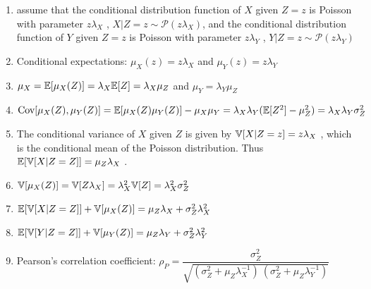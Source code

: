 \begin{enumerate}
    \item assume that the conditional distribution function of $X$ given $Z = z$ is Poisson with parameter $z\lambda_X$ , $X|Z = z \sim \mathcal{P}(z\lambda_X )$, and the conditional distribution function of $Y$ given $Z = z$ is Poisson with parameter $z\lambda_Y$ , $Y |Z = z \sim \mathcal{P}(z\lambda_Y )$
    \hfill \cite{statistics/book/Statistics-for-Data-Scientists/Maurits-Kaptein}

    \item Conditional expectations: $\mu_X (z) = z\lambda_X$ and $\mu_Y (z) = z\lambda_Y$
    \hfill \cite{statistics/book/Statistics-for-Data-Scientists/Maurits-Kaptein}

    \item $\mu_X = \mathbb{E}[\mu_X (Z )] = \lambda_X \mathbb{E}[Z] = \lambda_X \mu_Z$ and $\mu_Y = \lambda_Y \mu_Z$ 
    \hfill \cite{statistics/book/Statistics-for-Data-Scientists/Maurits-Kaptein}

    \item 
    $
        \text{Cov}[\mu_X (Z ), \mu_Y (Z )] 
        = \mathbb{E}[\mu_X (Z )\mu_Y (Z )] - \mu_X \mu_Y 
        = \lambda_X \lambda_Y ( \mathbb{E}[Z^2] - \mu^2_Z ) 
        = \lambda_X \lambda_Y \sigma^2_Z 
    $
    \hfill \cite{statistics/book/Statistics-for-Data-Scientists/Maurits-Kaptein}

    \item The conditional variance of $X$ given $Z$ is given by $\mathbb{V}[X|Z = z] = z\lambda_X$ , which is the conditional mean of the Poisson distribution. Thus $\mathbb{E}[\mathbb{V}[X|Z = Z]] = \mu_Z \lambda_X$ . 
    \hfill \cite{statistics/book/Statistics-for-Data-Scientists/Maurits-Kaptein}

    \item $\mathbb{V}[\mu_X (Z )] = \mathbb{V}[Z \lambda_X] = \lambda^2_X \mathbb{V}[Z] = \lambda^2_X \sigma^2_Z$
    \hfill \cite{statistics/book/Statistics-for-Data-Scientists/Maurits-Kaptein}

    \item $\mathbb{E}[\mathbb{V}[X|Z =Z]] + \mathbb{V}[\mu_X (Z)] = \mu_Z \lambda_X + \sigma^2_Z \lambda^2_X$
    \hfill \cite{statistics/book/Statistics-for-Data-Scientists/Maurits-Kaptein}
    
    \item $\mathbb{E}[\mathbb{V}[Y|Z =Z]] + \mathbb{V}[\mu_Y (Z)] = \mu_Z \lambda_Y + \sigma^2_Z \lambda^2_Y$ 
    \hfill \cite{statistics/book/Statistics-for-Data-Scientists/Maurits-Kaptein}

    \item Pearson’s correlation coefficient:
    $
        \rho_P = \dfrac{\sigma^2_Z}{\sqrt{(\sigma^2_Z + \mu_Z \lambda^{-1}_X )\ (\sigma^2_Z + \mu_Z \lambda^{-1}_Y )}}
    $
    \hfill \cite{statistics/book/Statistics-for-Data-Scientists/Maurits-Kaptein}
\end{enumerate}



